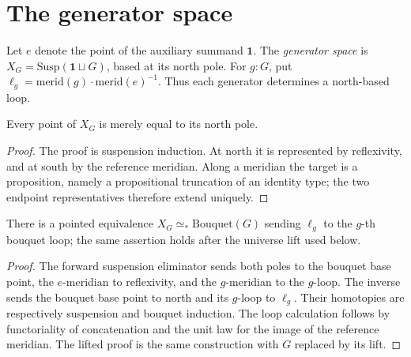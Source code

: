 \section{The generator space}

\begin{definition}
Let $e$ denote the point of the auxiliary summand $\mathbf{1}$.  The
\emph{generator space} is $X_G=\mathrm{Susp}(\mathbf{1}\sqcup G)$, based at
its north pole.  For $g:G$, put $\ell_g=\mathrm{merid}(g)\cdot
\mathrm{merid}(e)^{-1}$.  Thus each generator determines a north-based loop.
\end{definition}

\begin{lemma}
Every point of $X_G$ is merely equal to its north pole.
\end{lemma}
\begin{proof}
The proof is suspension induction.  At north it is represented by reflexivity,
and at south by the reference meridian.  Along a meridian the target is a
proposition, namely a propositional truncation of an identity type; the two
endpoint representatives therefore extend uniquely.
\end{proof}

\begin{proposition}
There is a pointed equivalence $X_G\simeq_*\mathrm{Bouquet}(G)$ sending
$\ell_g$ to the $g$-th bouquet loop; the same assertion holds after the
universe lift used below.
\end{proposition}
\begin{proof}
The forward suspension eliminator sends both poles to the bouquet base point,
the $e$-meridian to reflexivity, and the $g$-meridian to the $g$-loop.  The
inverse sends the bouquet base point to north and its $g$-loop to $\ell_g$.
Their homotopies are respectively suspension and bouquet induction.  The
loop calculation follows by functoriality of concatenation and the unit law
for the image of the reference meridian.  The lifted proof is the same
construction with $G$ replaced by its lift.
\end{proof}
